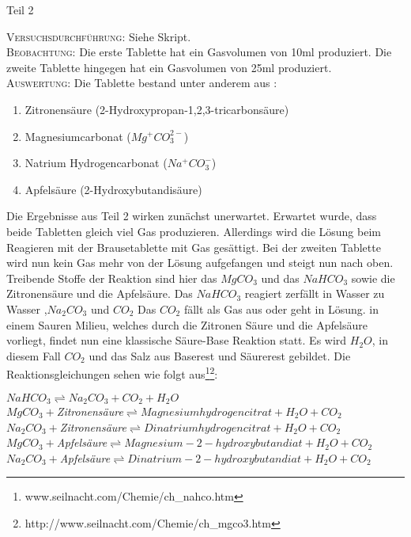 \documentclass[11pt, a4paper]{article}
\begin{document}
	\begin{center}
	Teil 2
	\end{center}
	
\textsc{Versuchsdurchführung:} Siehe Skript.\\

\textsc{Beobachtung:}\hspace{5mm} Die erste Tablette hat ein Gasvolumen von 10ml produziert. Die zweite Tablette hingegen hat ein Gasvolumen von 25ml produziert.\\

\textsc{Auswertung:}\hspace{8mm} Die Tablette bestand unter anderem aus :

\begin{enumerate}
\item Zitronensäure (2-Hydroxypropan-1,2,3-tricarbonsäure)
\item Magnesiumcarbonat ($Mg^+CO^{2-}_3$)
\item Natrium Hydrogencarbonat ($Na^+CO_3^-$)
\item Apfelsäure (2-Hydroxybutandisäure)
\end{enumerate}

Die Ergebnisse aus Teil 2 wirken zunächst unerwartet. Erwartet wurde, dass beide Tabletten gleich viel Gas produzieren.
Allerdings wird die Lösung beim Reagieren mit der Brausetablette mit Gas gesättigt. Bei der zweiten Tablette wird nun kein Gas mehr von der Lösung aufgefangen und steigt nun nach oben.
Treibende Stoffe der Reaktion sind hier das $MgCO_3$ und das $NaHCO_3$ sowie die Zitronensäure und die Apfelsäure. Das $NaHCO_3$ reagiert zerfällt in Wasser zu Wasser ,$Na_2CO_3$ und $CO_2$ Das $CO_2$ fällt als Gas aus oder geht in Lösung. in einem Sauren Milieu, welches durch die Zitronen Säure und die Apfelsäure vorliegt, findet nun eine klassische Säure-Base Reaktion statt. Es wird $H_2O$, in diesem Fall $CO_2$ und das Salz aus Baserest und Säurerest gebildet. Die Reaktionsgleichungen sehen wie folgt aus\footnote{www.seilnacht.com/Chemie/ch\_nahco.htm}\footnote{http://www.seilnacht.com/Chemie/ch\_mgco3.htm}:\\
\begin{center}
$NaHCO_3 \rightleftharpoons Na_2CO_3 + CO_2 +  H_2O$ \\
$MgCO_3 +$\textit{Zitronensäure}$ \rightleftharpoons Magnesiumhydrogencitrat + H_2O + CO_2$\\
$Na_2CO_3 +$\textit{Zitronensäure}$ \rightleftharpoons Dinatriumhydrogencitrat + H_2O + CO_2$\\
$MgCO_3 +$\textit{Apfelsäure}$ \rightleftharpoons Magnesium-2-hydroxybutandiat + H_2O + CO_2$\\
$Na_2CO_3 +$\textit{Apfelsäure}$ \rightleftharpoons Dinatrium-2-hydroxybutandiat + H_2O + CO_2$\\

\end{center}
\end{document}
